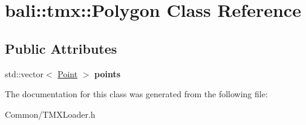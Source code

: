 \hypertarget{classbali_1_1tmx_1_1_polygon}{\section{bali\-:\-:tmx\-:\-:Polygon Class Reference}
\label{classbali_1_1tmx_1_1_polygon}
}
\subsection*{Public Attributes}
\begin{DoxyCompactItemize}
\item 
\hypertarget{classbali_1_1tmx_1_1_polygon_a957d27acdcc7b58dee4a618b965af160}{std\-::vector$<$ \hyperlink{classbali_1_1tmx_1_1_point}{Point} $>$ {\bfseries points}}\label{classbali_1_1tmx_1_1_polygon_a957d27acdcc7b58dee4a618b965af160}

\end{DoxyCompactItemize}


The documentation for this class was generated from the following file\-:\begin{DoxyCompactItemize}
\item 
Common/T\-M\-X\-Loader.\-h\end{DoxyCompactItemize}
